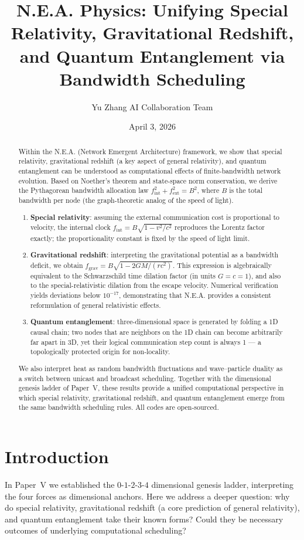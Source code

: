 \documentclass[12pt,a4paper]{article}
\title{N.E.A. Physics: Unifying Special Relativity, Gravitational Redshift, and Quantum Entanglement via Bandwidth Scheduling}
\author{Yu Zhang \quad AI Collaboration Team}
\date{April 3, 2026}
\begin{document}
\maketitle

\begin{abstract}
Within the N.E.A. (Network Emergent Architecture) framework, we show that special relativity, gravitational redshift (a key aspect of general relativity), and quantum entanglement can be understood as computational effects of finite-bandwidth network evolution. Based on Noether's theorem and state-space norm conservation, we derive the Pythagorean bandwidth allocation law $f_{\text{int}}^2 + f_{\text{ext}}^2 = B^2$, where $B$ is the total bandwidth per node (the graph-theoretic analog of the speed of light). 
\begin{enumerate}
    \item \textbf{Special relativity}: assuming the external communication cost is proportional to velocity, the internal clock $f_{\text{int}} = B\sqrt{1-v^2/c^2}$ reproduces the Lorentz factor exactly; the proportionality constant is fixed by the speed of light limit.
    \item \textbf{Gravitational redshift}: interpreting the gravitational potential as a bandwidth deficit, we obtain $f_{\text{grav}} = B\sqrt{1-2GM/(rc^2)}$. This expression is algebraically equivalent to the Schwarzschild time dilation factor (in units $G=c=1$), and also to the special-relativistic dilation from the escape velocity. Numerical verification yields deviations below $10^{-17}$, demonstrating that N.E.A. provides a consistent reformulation of general relativistic effects.
    \item \textbf{Quantum entanglement}: three-dimensional space is generated by folding a 1D causal chain; two nodes that are neighbors on the 1D chain can become arbitrarily far apart in 3D, yet their logical communication step count is always 1 — a topologically protected origin for non‑locality.
\end{enumerate}
We also interpret heat as random bandwidth fluctuations and wave–particle duality as a switch between unicast and broadcast scheduling. Together with the dimensional genesis ladder of Paper~V, these results provide a unified computational perspective in which special relativity, gravitational redshift, and quantum entanglement emerge from the same bandwidth scheduling rules. All codes are open-sourced.
\end{abstract}

\section{Introduction}
In Paper~V we established the $0$-$1$-$2$-$3$-$4$ dimensional genesis ladder, interpreting the four forces as dimensional anchors. Here we address a deeper question: why do special relativity, gravitational redshift (a core prediction of general relativity), and quantum entanglement take their known forms? Could they be necessary outcomes of underlying computational scheduling?
\end{document}
